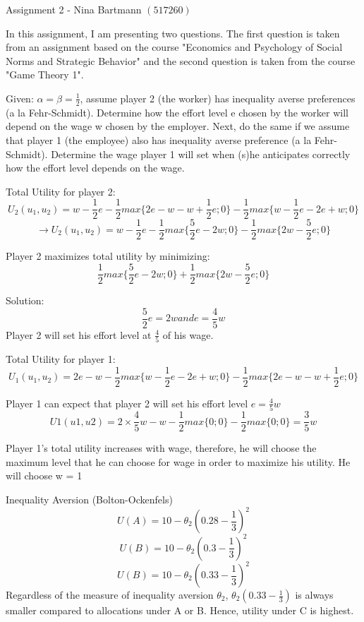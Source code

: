 \documentclass{article}
\begin{document}
Assignment 2 - Nina Bartmann $(517260)$

In this assignment, I am presenting two questions. The first question is taken from an assignment based on the course "Economics and Psychology of Social Norms and Strategic Behavior" and the second question is taken from the course "Game Theory 1". 

Given: $\alpha = \beta = \frac{1}{2}$, assume player 2 (the worker) has inequality averse preferences (a la Fehr-Schmidt). Determine how the effort level e chosen by the worker will depend on the wage w chosen by the employer. Next, do the same if we assume that player 1 (the employee) also has inequality averse preference (a la Fehr-Schmidt). Determine the wage player 1 will set when (s)he anticipates correctly how the effort level depends on the wage.

Total Utility for player 2: 
$$U_2(u_1, u_2) = w-\frac{1}{2}e - \frac{1}{2} max\Big\{2e-w-w + \frac{1}{2}e ; 0\Big\}- \frac{1}{2} max\Big\{w-\frac{1}{2}e - 2e+w; 0\Big\}$$
$$\rightarrow U_2(u_1, u_2) = w-\frac{1}{2}e - \frac{1}{2} max\Big\{\frac{5}{2}e-2w ; 0\Big\}- \frac{1}{2} max\Big\{2w-\frac{5}{2}e ; 0\Big\}$$

Player 2 maximizes total utility by minimizing: $$\frac{1}{2} max\Big\{\frac{5}{2}e-2w ; 0\Big\}+ \frac{1}{2} max\Big\{2w -\frac{5}{2}e ; 0\Big\}$$

Solution: $$\frac{5}{2}e = 2w and e = \frac{4}{5}w$$
Player 2 will set his effort level at $\frac{4}{5}$ of his wage. 


Total Utility for player 1: 
$$U_1(u_1, u_2) = 2e - w - \frac{1}{2} max\Big\{w - \frac{1}{2}e -2e+w ; 0\Big\} - \frac{1}{2} max\Big\{2e-w-w +\frac{1}{2}e; 0\Big\}$$

Player 1 can expect that player 2 will set his effort level $e = \frac{4}{5}w$
$$U1(u1, u2) = 2\times\frac{4}{5}w - w - \frac{1}{2} max\Big\{0 ; 0\Big\} - \frac{1}{2} max\Big\{0; 0\Big\} = \frac{3}{5}w$$

Player 1's total utility increases with wage, therefore, he will choose the maximum level that he can choose for wage in order to maximize his utility. He will choose w = 1



Inequality Aversion (Bolton-Ockenfels) 
$$U(A) = 10 - \theta_2(0.28 - \frac{1}{3})^2$$
$$U(B) = 10 - \theta_2(0.3 - \frac{1}{3})^2$$
$$U(B) = 10 - \theta_2(0.33 - \frac{1}{3})^2$$
Regardless of the measure of inequality aversion $\theta_2$, $\theta_2(0.33 - \frac{1}{3})$ is always smaller compared to allocations under A or B. Hence, utility under C is highest. 
\end{document}

